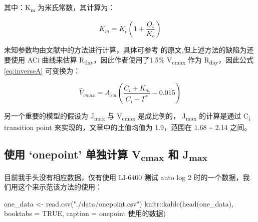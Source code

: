 \documentclass[
]{krantz}
\makeatletter
\newenvironment{Shaded}{\begin{snugshade}}{\end{snugshade}}
\newcommand{\AttributeTok}[1]{\textcolor[rgb]{0.77,0.63,0.00}{#1}}
\newcommand{\ConstantTok}[1]{\textcolor[rgb]{0.00,0.00,0.00}{#1}}
\newcommand{\FunctionTok}[1]{\textcolor[rgb]{0.00,0.00,0.00}{#1}}
\newcommand{\NormalTok}[1]{#1}
\newcommand{\OtherTok}[1]{\textcolor[rgb]{0.56,0.35,0.01}{#1}}
\newcommand{\SpecialCharTok}[1]{\textcolor[rgb]{0.00,0.00,0.00}{#1}}
\newcommand{\StringTok}[1]{\textcolor[rgb]{0.31,0.60,0.02}{#1}}
\newenvironment{kframe}{%
\medskip{}
\setlength{\fboxsep}{.8em}
 \def\at@end@of@kframe{}%
 \ifinner\ifhmode%
  \def\at@end@of@kframe{\end{minipage}}%
  \begin{minipage}{\columnwidth}%
 \fi\fi%
 \def\FrameCommand##1{\hskip\@totalleftmargin \hskip-\fboxsep
 \colorbox{shadecolor}{##1}\hskip-\fboxsep
     \hskip-\linewidth \hskip-\@totalleftmargin \hskip\columnwidth}%
 \MakeFramed {\advance\hsize-\width
   \@totalleftmargin\z@ \linewidth\hsize
   \@setminipage}}%
 {\par\unskip\endMakeFramed%
 \at@end@of@kframe}
\renewenvironment{Shaded}{\begin{kframe}}{\end{kframe}}
\makeatother
\begin{document}
其中：K\textsubscript{m} 为米氏常数，其计算为：

\begin{equation}
K_m = K_c (1 + \frac{O_i}{K_o}) 
\label{eq:km}
\end{equation}

未知参数均由文献中的方法进行计算，具体可参考 \citet{De2016A} 的原文,但上述方法的缺陷为还要使用 ACi 曲线来估算 R\textsubscript{day}，因此作者使用了1.5\% V\textsubscript{cmax} 作为 R\textsubscript{day}，因此公式 \eqref{eq:inverseA} 可变换为：

\begin{equation}
\hat{V}_{cmax} = A_{sat} (\frac{C_i + K_m}{C_i - \Gamma^*} - 0.015)
\label{eq:onepoint}
\end{equation}

另一个重要的模型的假设为 J\textsubscript{max} 与 V\textsubscript{cmax} 是成比例的， J\textsubscript{max} 的计算是通过 C\textsubscript{i} transition point 来实现的，文章中的比值均值为 1.9，范围在 1.68 \textasciitilde{} 2.14 之间。

\hypertarget{onpoint_fit}{%
\subsection{\texorpdfstring{使用 `onepoint' 单独计算 V\textsubscript{cmax} 和 J\textsubscript{max}}{使用 `onepoint' 单独计算 Vcmax 和 Jmax}}\label{onpoint_fit}}

目前我手头没有相应数据，仅有使用 LI-6400 测试 auto log 2 时的一个数据，我们用这个来示范该方法的使用：

\begin{Shaded}
\begin{Highlighting}[]
\NormalTok{one\_data }\OtherTok{\textless{}{-}} \FunctionTok{read.csv}\NormalTok{(}\StringTok{"./data/onepoint.csv"}\NormalTok{)}
\NormalTok{knitr}\SpecialCharTok{::}\FunctionTok{kable}\NormalTok{(}\FunctionTok{head}\NormalTok{(one\_data), }\AttributeTok{booktabs =} \ConstantTok{TRUE}\NormalTok{,}
             \AttributeTok{caption =} \StringTok{\textquotesingle{}onepoint 使用的数据\textquotesingle{}}\NormalTok{)}
\end{Highlighting}
\end{Shaded}
\end{document}

